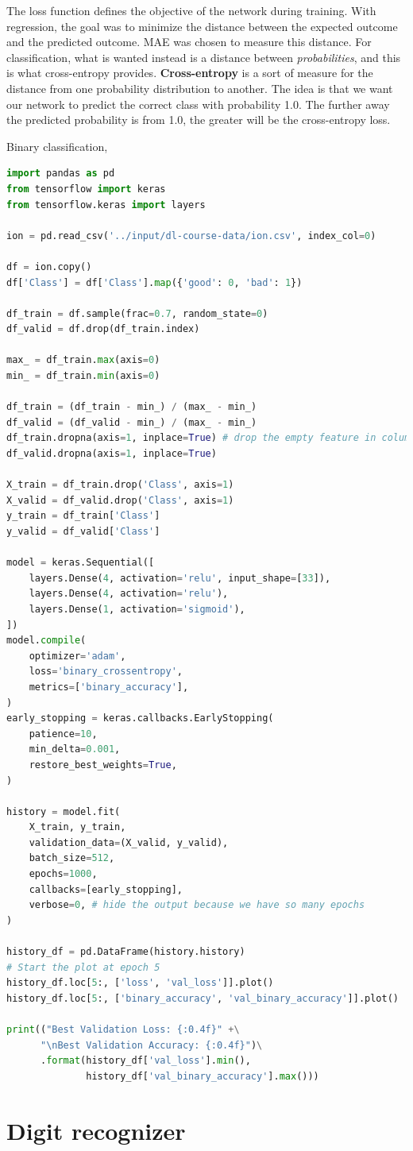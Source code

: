 \noindent The loss function defines the objective of the network during training. With
regression, the goal was to minimize the distance between the expected outcome and the 
predicted outcome. MAE was chosen to measure this distance. For classification, what is
wanted instead is a distance between \emph{probabilities}, and this is what cross-entropy
provides. \textbf{Cross-entropy} is a sort of measure for the distance from one probability
distribution to another. The idea is that we want our network to predict the correct class
with probability 1.0. The further away the predicted probability is from 1.0, the greater
will be the cross-entropy loss.

\vspace{0.5cm}

\noindent Binary classification,

\begin{lstlisting}[language=Python]
import pandas as pd
from tensorflow import keras
from tensorflow.keras import layers

ion = pd.read_csv('../input/dl-course-data/ion.csv', index_col=0)

df = ion.copy()
df['Class'] = df['Class'].map({'good': 0, 'bad': 1})

df_train = df.sample(frac=0.7, random_state=0)
df_valid = df.drop(df_train.index)

max_ = df_train.max(axis=0)
min_ = df_train.min(axis=0)

df_train = (df_train - min_) / (max_ - min_)
df_valid = (df_valid - min_) / (max_ - min_)
df_train.dropna(axis=1, inplace=True) # drop the empty feature in column 2
df_valid.dropna(axis=1, inplace=True)

X_train = df_train.drop('Class', axis=1)
X_valid = df_valid.drop('Class', axis=1)
y_train = df_train['Class']
y_valid = df_valid['Class']

model = keras.Sequential([
    layers.Dense(4, activation='relu', input_shape=[33]),
    layers.Dense(4, activation='relu'),    
    layers.Dense(1, activation='sigmoid'),
])
model.compile(
    optimizer='adam',
    loss='binary_crossentropy',
    metrics=['binary_accuracy'],
)
early_stopping = keras.callbacks.EarlyStopping(
    patience=10,
    min_delta=0.001,
    restore_best_weights=True,
)

history = model.fit(
    X_train, y_train,
    validation_data=(X_valid, y_valid),
    batch_size=512,
    epochs=1000,
    callbacks=[early_stopping],
    verbose=0, # hide the output because we have so many epochs
)

history_df = pd.DataFrame(history.history)
# Start the plot at epoch 5
history_df.loc[5:, ['loss', 'val_loss']].plot()
history_df.loc[5:, ['binary_accuracy', 'val_binary_accuracy']].plot()

print(("Best Validation Loss: {:0.4f}" +\
      "\nBest Validation Accuracy: {:0.4f}")\
      .format(history_df['val_loss'].min(), 
              history_df['val_binary_accuracy'].max()))
\end{lstlisting}

\section{Digit recognizer}



